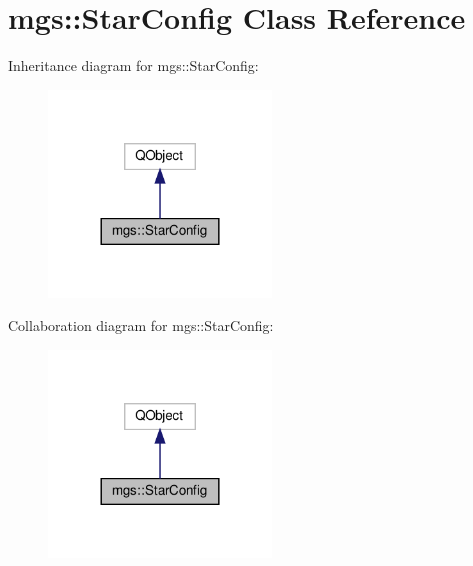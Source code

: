 \hypertarget{classmgs_1_1StarConfig}{}\section{mgs\+:\+:Star\+Config Class Reference}
\label{classmgs_1_1StarConfig}


Inheritance diagram for mgs\+:\+:Star\+Config\+:
\nopagebreak
\begin{figure}[H]
\begin{center}
\leavevmode
\includegraphics[width=168pt]{classmgs_1_1StarConfig__inherit__graph}
\end{center}
\end{figure}


Collaboration diagram for mgs\+:\+:Star\+Config\+:
\nopagebreak
\begin{figure}[H]
\begin{center}
\leavevmode
\includegraphics[width=168pt]{classmgs_1_1StarConfig__coll__graph}
\end{center}
\end{figure}
